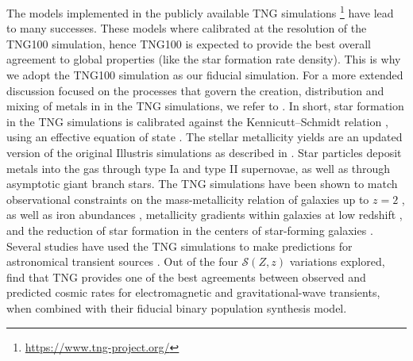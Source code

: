 \documentclass[linenumbers,twocolumn]{aastex631}
\newcommand{\SFRDzZ}{\ensuremath{\mathcal{S}(Z,z)}\xspace}
\begin{document}
The models implemented in the publicly available TNG simulations \citep{Nelson2019b}\footnote{ \url{https://www.tng-project.org/}} have lead to many successes. 
These models where calibrated at the resolution of the TNG100 simulation, hence TNG100 is expected to provide the best overall agreement to global properties (like the star formation rate density). This is why we adopt the TNG100 simulation as our fiducial simulation.
%
For a more extended discussion focused on the processes that govern the creation, distribution and mixing of metals in in the TNG simulations, we refer to \cite{Pakmor+2022}. In short, star formation in the TNG simulations is calibrated against the Kennicutt–Schmidt relation \citep[][]{Schmidt1959,Kennicutt1989}, using an effective equation of state \citep{SpringelHernquist2003}. The stellar metallicity yields are an updated version of the original Illustris simulations as described in \cite{Pillepich2018}. Star particles deposit metals into the gas through type Ia and type II supernovae, as well as through asymptotic giant branch stars. 
The TNG simulations have been shown to match observational constraints on the mass-metallicity relation of galaxies up to $z = 2$ \citep{Torrey+2019}, as well as iron abundances \citep{FirstResTNG_Naiman2018}, metallicity gradients within galaxies at low redshift \citep{Hemler+2021}, and the reduction of star formation in the centers of star-forming galaxies \citep{Nelson2021}. 
Several studies have used the TNG simulations to make predictions for astronomical transient sources \citep[e.g.][]{Briel+2022_rates,Bavera+2022,vanson+2022}. 
Out of the four \SFRDzZ variations explored, \cite{Briel+2022_rates} find that TNG provides one of the best agreements between observed and predicted cosmic rates for electromagnetic and gravitational-wave transients, when combined with their fiducial binary population synthesis model. 
\end{document}
